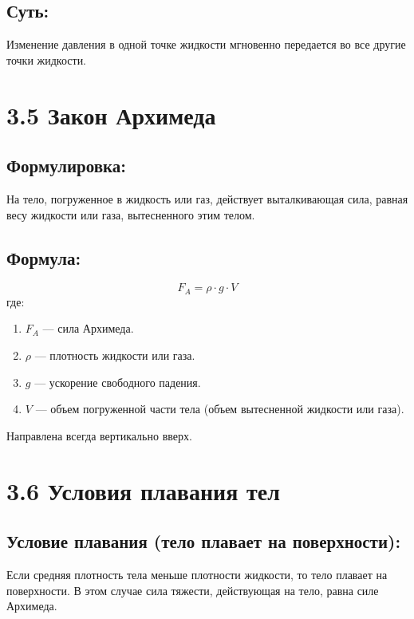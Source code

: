 \documentclass[a4paper,12pt]{article}
\begin{document}
\vspace{-9pt}
\subsection*{Суть:}
\vspace{-3pt}
Изменение давления в одной точке жидкости мгновенно передается во все другие точки жидкости.



\section*{3.5 Закон Архимеда}
\vspace{-9pt}
\subsection*{Формулировка:}
\vspace{-3pt}
На тело, погруженное в жидкость или газ, действует выталкивающая сила, равная весу жидкости или газа, вытесненного этим телом.

\vspace{-9pt}
\subsection*{Формула:}
\vspace{-3pt}
\vspace{-0.05em}
$$ F_A = \rho \cdot g \cdot V $$
где:
\begin{enumerate} [itemsep=0pt, topsep=0pt, parsep=0pt]
    \item $F_A$ — сила Архимеда.
    \item $\rho$ — плотность жидкости или газа.
    \item $g$ — ускорение свободного падения.
    \item $V$ — объем погруженной части тела (объем вытесненной жидкости или газа).
\end{enumerate}
\vspace{10pt}
Направлена всегда вертикально вверх.


\newpage


\section*{3.6 Условия плавания тел}
\vspace{-9pt}
\subsection*{Условие плавания (тело плавает на поверхности):}
\vspace{-3pt}
Если средняя плотность тела меньше плотности жидкости, то тело плавает на поверхности. В этом случае сила тяжести, действующая на тело, равна силе Архимеда.
\end{document}
